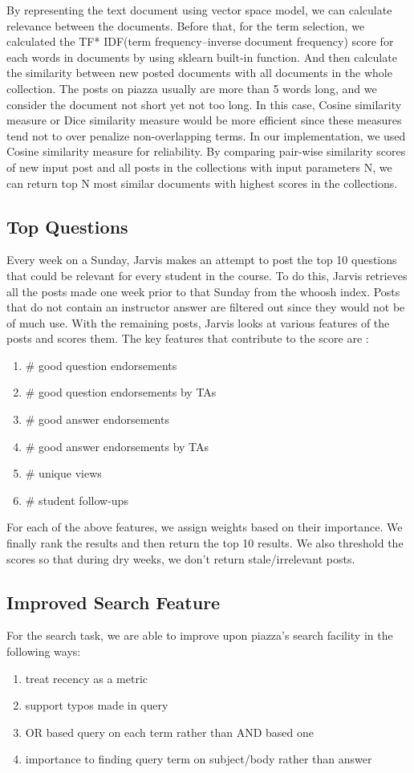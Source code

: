 \documentclass[sigconf]{acmart}
\begin{document}
By representing the text document using vector space model, we can calculate relevance between the documents. Before that, for the term selection, we calculated the TF* IDF(term frequency–inverse document frequency) score for each words in documents by using sklearn built-in function. And then calculate the similarity between new posted documents with all documents in the whole collection. The posts on piazza usually are more than 5 words long, and we consider the document not short yet not too long. In this case, Cosine similarity measure or Dice similarity measure would be more efficient since these measures tend not to over penalize non-overlapping terms. In our implementation, we used Cosine similarity measure for reliability. By comparing pair-wise similarity scores of new input post and all posts in the collections  with input parameters N, we can return top N most similar documents with highest scores in the collections. 

\subsection{Top Questions}
Every week on a Sunday, Jarvis makes an attempt to post the top 10 questions that could be relevant for every student in the course. To do this, Jarvis retrieves all the posts made one week prior to that Sunday from the whoosh index. Posts that do not contain an instructor answer are filtered out since they would not be of much use. With the remaining posts, Jarvis looks at various features of the posts and scores them. The key features that contribute to the score are :

\begin{enumerate}
  \item \# good question endorsements
  \item \# good question endorsements by TAs
  \item \# good answer endorsements
  \item \# good answer endorsements by TAs
  \item \# unique views
  \item \# student follow-ups
\end{enumerate}

For each of the above features, we assign weights based on their importance. We finally rank the results and then return the top 10 results. We also threshold the scores so that during dry weeks, we don't return stale/irrelevant posts.

\subsection{Improved Search Feature}
For the search task, we are able to improve upon piazza's search facility in the following ways:
\begin{enumerate}
\item treat recency as a metric
\item support typos made in query
\item OR based query on each term rather than AND based one
\item importance to finding query term on subject/body rather than answer
\end{enumerate}
\end{document}
